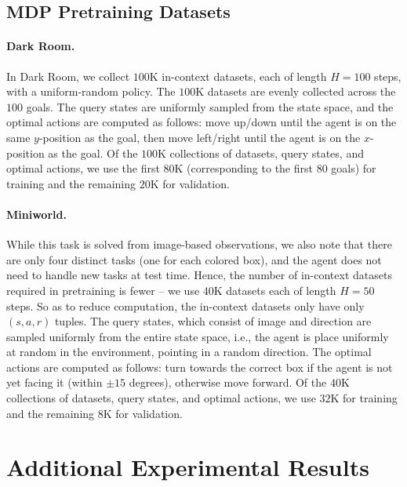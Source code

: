 \subsection{MDP Pretraining Datasets}
\label{app:pretrain-data}

\paragraph{Dark Room.} In Dark Room, we collect $100$K in-context datasets, each of length $H = 100$ steps, with a uniform-random policy. The $100$K datasets are evenly collected across the $100$ goals. The query states are uniformly sampled from the state space, and the optimal actions are computed as follows: move up/down until the agent is on the same $y$-position as the goal, then move left/right until the agent is on the $x$-position as the goal. Of the $100$K collections of datasets, query states, and optimal actions, we use the first $80$K (corresponding to the first $80$ goals) for training and the remaining $20$K for validation.

\paragraph{Miniworld.} While this task is solved from image-based observations, we also note that there are only four distinct tasks (one for each colored box), and the agent does not need to handle new tasks at test time. Hence, the number of in-context datasets required in pretraining is fewer -- we use $40$K datasets each of length $H = 50$ steps. So as to reduce computation, the in-context datasets only have only $(s, a, r)$ tuples. The query states, which consist of image and direction are sampled uniformly from the entire state space, i.e., the agent is place uniformly at random in the environment, pointing in a random direction. The optimal actions are computed as follows: turn towards the correct box if the agent is not yet facing it (within $\pm 15$ degrees), otherwise move forward. Of the $40$K collections of datasets, query states, and optimal actions, we use $32$K for training and the remaining $8$K for validation.

\section{Additional Experimental Results}
\label{app:more-exps}


